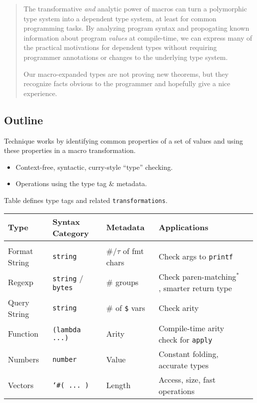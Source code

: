 \documentclass{article}
\begin{document}
\begin{abstract}
  The transformative \emph{and} analytic power of macros can turn
   a polymorphic type system into a dependent type system, at least
   for common programming tasks.
  By analyzing program syntax and propogating known information about program
   \emph{values} at compile-time, we can express many of the practical
   motivations for dependent types without requiring programmer annotations
   or changes to the underlying type system.

  Our macro-expanded types are not proving new theorems,
   but they recognize facts obvious to the programmer and hopefully
   give a nice experience.
\end{abstract}

\subsection*{Outline}

Technique works by identifying common properties of a set of
 values and using these properties in a macro transformation.

\begin{itemize}
  \item Context-free, syntactic, curry-style ``type'' checking.
  \item Operations using the type tag \& metadata.
\end{itemize}

Table defines type tags and related \texttt{transformations}.

\vspace{0.4cm}
\begin{center}
\hspace{-4cm}\begin{tabular}{l l l l l}
  Type          &    Syntax Category          &    Metadata    &    Applications    \\\hline\hline
\\Format String &       {\tt string}          &     \#/$\tau$ of fmt chars & Check args to {\tt printf}
\\Regexp        &  {\tt string} / {\tt bytes} & \# groups & Check paren-matching${}^*$, smarter return type
\\Query String  &  {\tt string}               & \# of {\tt \$} vars & Check arity
\\Function      &  {\tt (lambda ...)}         & Arity        & Compile-time arity check for {\tt apply}
\\Numbers       &  {\tt number}               & Value & Constant folding, accurate types
\\Vectors       &  {\tt `\#( ... )}            & Length & Access, size, fast operations
\end{tabular}
\end{center}
\end{document}

